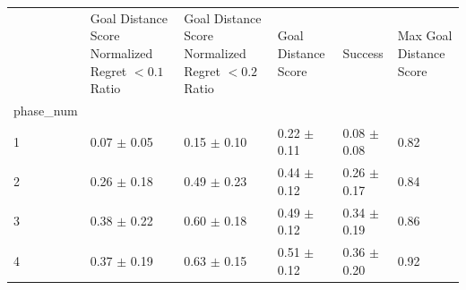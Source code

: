 \begin{tabular}{llllll}
\toprule
 & Goal Distance Score Normalized Regret $< 0.1$ Ratio & Goal Distance Score Normalized Regret $< 0.2$ Ratio & Goal Distance Score & Success & Max Goal Distance Score \\
phase_num &  &  &  &  &  \\
\midrule
1 & 0.07 $\pm$ 0.05 & 0.15 $\pm$ 0.10 & 0.22 $\pm$ 0.11 & 0.08 $\pm$ 0.08 & 0.82 \\
2 & 0.26 $\pm$ 0.18 & 0.49 $\pm$ 0.23 & 0.44 $\pm$ 0.12 & 0.26 $\pm$ 0.17 & 0.84 \\
3 & 0.38 $\pm$ 0.22 & 0.60 $\pm$ 0.18 & 0.49 $\pm$ 0.12 & 0.34 $\pm$ 0.19 & 0.86 \\
4 & 0.37 $\pm$ 0.19 & 0.63 $\pm$ 0.15 & 0.51 $\pm$ 0.12 & 0.36 $\pm$ 0.20 & 0.92 \\
\bottomrule
\end{tabular}
